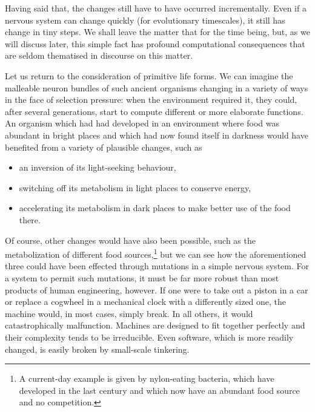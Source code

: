 Having said that, the changes still have to have occurred incrementally. Even if a nervous system can change quickly (for evolutionary timescales), it still has change in tiny steps. We shall leave the matter that for the time being, but, as we will discuss later, this simple fact has profound computational consequences that are seldom thematised in discourse on this matter. 

Let us return to the consideration of primitive life forms. We can imagine the malleable neuron bundles of such ancient organisms changing in a variety of ways in the face of selection pressure: when the environment required it, they could, after several generations, start to compute different or more elaborate functions. An organism which had had developed in an environment where food was abundant in bright places and which had now found itself in darkness would have benefited from a variety of plausible changes, such as
\begin{itemize}
	\item an inversion of its light-seeking behaviour,
	\item switching off its metabolism in light places to conserve energy,
	\item accelerating its metabolism in dark places to make better use of the food there.
\end{itemize}

Of course, other changes would have also been possible, such as the metabolization of different food sources,\footnote{A current-day example is given by nylon-eating bacteria, which have developed in the last century and which now have an abundant food source and no competition.} but we can see how the aforementioned three could have been effected through mutations in a simple nervous system. For a system to permit such mutations, it must be far more robust than most products of human engineering, however. If one were to take out a piston in a car or replace a cogwheel in a mechanical clock with a differently sized one, the machine would, in most cases, simply break. In all others, it would catastrophically malfunction. Machines are designed to fit together perfectly and their complexity tends to be irreducible. Even software, which is more readily changed, is easily broken by small-scale tinkering.

